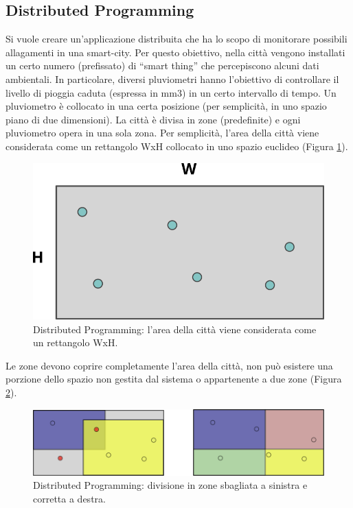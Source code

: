 \documentclass[12pt,a4paper,openright,twoside]{book}
\begin{document}
\subsection{Distributed Programming}
Si vuole creare un’applicazione distribuita che ha lo scopo di monitorare possibili allagamenti in una smart-city. Per questo obiettivo, nella città vengono installati un certo numero (prefissato) di “smart thing” che percepiscono alcuni dati ambientali. In particolare, diversi pluviometri hanno l’obiettivo di controllare il livello di pioggia caduta (espressa in mm3) in un certo intervallo di tempo. Un pluviometro è collocato in una certa posizione (per semplicità, in uno spazio piano di due dimensioni). La città è divisa in zone (predefinite) e ogni pluviometro opera in una sola zona. Per semplicità, l’area della città viene considerata come un rettangolo WxH collocato in uno spazio euclideo (Figura \ref{fig:dpc}).
\begin{figure}[H]
	\centering
	\includegraphics[width=\textwidth]{figures/distributed-programming-city.png}
	\caption{Distributed Programming: l’area della città viene considerata come un rettangolo WxH.}
	\label{fig:dpc}
\end{figure}
Le zone devono coprire completamente l’area della città, non può esistere una porzione dello spazio non gestita dal sistema o appartenente a due zone (Figura \ref{fig:dpd}). 
\begin{figure}[H]
	\centering
	\includegraphics[width=\textwidth]{figures/distributed-programming-division.png}
	\caption{Distributed Programming: divisione in zone sbagliata a sinistra e corretta a destra.}
	\label{fig:dpd}
\end{figure}
\end{document}
